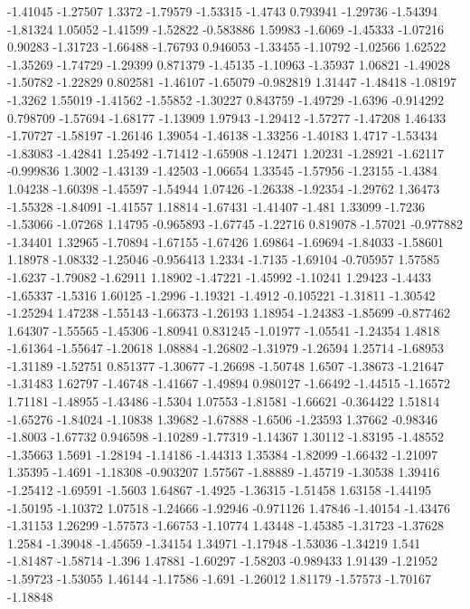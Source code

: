 \documentclass[9pt]{article}
\theoremstyle{plain}
\theoremstyle{definition}
\theoremstyle{remark}
\numberwithin{equation}{section}
\begin{document}
-1.41045
-1.27507
1.3372
-1.79579
-1.53315
-1.4743
0.793941
-1.29736
-1.54394
-1.81324
1.05052
-1.41599
-1.52822
-0.583886
1.59983
-1.6069
-1.45333
-1.07216
0.90283
-1.31723
-1.66488
-1.76793
0.946053
-1.33455
-1.10792
-1.02566
1.62522
-1.35269
-1.74729
-1.29399
0.871379
-1.45135
-1.10963
-1.35937
1.06821
-1.49028
-1.50782
-1.22829
0.802581
-1.46107
-1.65079
-0.982819
1.31447
-1.48418
-1.08197
-1.3262
1.55019
-1.41562
-1.55852
-1.30227
0.843759
-1.49729
-1.6396
-0.914292
0.798709
-1.57694
-1.68177
-1.13909
1.97943
-1.29412
-1.57277
-1.47208
1.46433
-1.70727
-1.58197
-1.26146
1.39054
-1.46138
-1.33256
-1.40183
1.4717
-1.53434
-1.83083
-1.42841
1.25492
-1.71412
-1.65908
-1.12471
1.20231
-1.28921
-1.62117
-0.999836
1.3002
-1.43139
-1.42503
-1.06654
1.33545
-1.57956
-1.23155
-1.4384
1.04238
-1.60398
-1.45597
-1.54944
1.07426
-1.26338
-1.92354
-1.29762
1.36473
-1.55328
-1.84091
-1.41557
1.18814
-1.67431
-1.41407
-1.481
1.33099
-1.7236
-1.53066
-1.07268
1.14795
-0.965893
-1.67745
-1.22716
0.819078
-1.57021
-0.977882
-1.34401
1.32965
-1.70894
-1.67155
-1.67426
1.69864
-1.69694
-1.84033
-1.58601
1.18978
-1.08332
-1.25046
-0.956413
1.2334
-1.7135
-1.69104
-0.705957
1.57585
-1.6237
-1.79082
-1.62911
1.18902
-1.47221
-1.45992
-1.10241
1.29423
-1.4433
-1.65337
-1.5316
1.60125
-1.2996
-1.19321
-1.4912
-0.105221
-1.31811
-1.30542
-1.25294
1.47238
-1.55143
-1.66373
-1.26193
1.18954
-1.24383
-1.85699
-0.877462
1.64307
-1.55565
-1.45306
-1.80941
0.831245
-1.01977
-1.05541
-1.24354
1.4818
-1.61364
-1.55647
-1.20618
1.08884
-1.26802
-1.31979
-1.26594
1.25714
-1.68953
-1.31189
-1.52751
0.851377
-1.30677
-1.26698
-1.50748
1.6507
-1.38673
-1.21647
-1.31483
1.62797
-1.46748
-1.41667
-1.49894
0.980127
-1.66492
-1.44515
-1.16572
1.71181
-1.48955
-1.43486
-1.5304
1.07553
-1.81581
-1.66621
-0.364422
1.51814
-1.65276
-1.84024
-1.10838
1.39682
-1.67888
-1.6506
-1.23593
1.37662
-0.98346
-1.8003
-1.67732
0.946598
-1.10289
-1.77319
-1.14367
1.30112
-1.83195
-1.48552
-1.35663
1.5691
-1.28194
-1.14186
-1.44313
1.35384
-1.82099
-1.66432
-1.21097
1.35395
-1.4691
-1.18308
-0.903207
1.57567
-1.88889
-1.45719
-1.30538
1.39416
-1.25412
-1.69591
-1.5603
1.64867
-1.4925
-1.36315
-1.51458
1.63158
-1.44195
-1.50195
-1.10372
1.07518
-1.24666
-1.92946
-0.971126
1.47846
-1.40154
-1.43476
-1.31153
1.26299
-1.57573
-1.66753
-1.10774
1.43448
-1.45385
-1.31723
-1.37628
1.2584
-1.39048
-1.45659
-1.34154
1.34971
-1.17948
-1.53036
-1.34219
1.541
-1.81487
-1.58714
-1.396
1.47881
-1.60297
-1.58203
-0.989433
1.91439
-1.21952
-1.59723
-1.53055
1.46144
-1.17586
-1.691
-1.26012
1.81179
-1.57573
-1.70167
-1.18848
\end{document}
